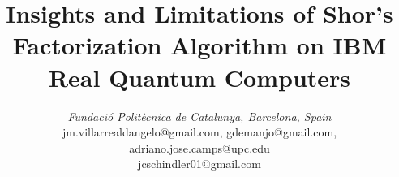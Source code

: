 \documentclass[conference,twoside]{IEEEtran}
\begin{document}
\title{Insights and Limitations of Shor's Factorization Algorithm on IBM Real Quantum Computers}

\author{
\textit{Fundació Politècnica de Catalunya, Barcelona, Spain }\\
jm.villarrealdangelo@gmail.com, gdemanjo@gmail.com, adriano.jose.camps@upc.edu\\jcschindler01@gmail.com}

\maketitle
\end{document}

